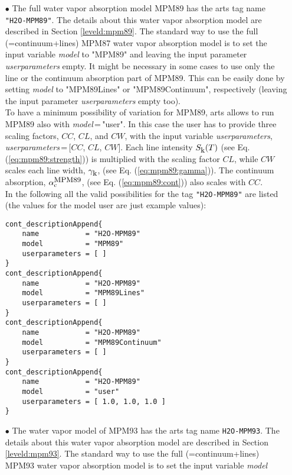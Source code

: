 \begin{itemize}
\item[$\bullet$] The full water vapor absorption model MPM89 \cite{liebe:89} 
     has the arts tag name {\tt "H2O-MPM89"}. The details about 
     this water vapor absorption model are described in 
     Section \ref{leveld:mpm89}.
     The standard way to use the full (=continuum+lines) MPM87 water 
     vapor absorption model is to set the input variable {\it model} 
     to "MPM89" and leaving the input parameter {\it userparameters} empty. 
     It might be necessary in some cases to use only the line or the 
     continuum absorption part of MPM89. This can be easily done 
     by setting {\it model} to "MPM89Lines" or "MPM89Continuum", 
     respectively (leaving the input parameter {\it userparameters} 
     empty too).\\ To have a minimum possibility of variation for MPM89, 
     arts allows to run MPM89 also with {\it model}\,=\,"user". 
     In this case the user has to provide three scaling factors,  
     $CC$, $CL$, and $CW$, with the input variable {\it userparameters}, 
     {\it userparameters}\,=\,$[$$CC$, $CL$, $CW$$]$. 
     Each line intensity $S_{\mbox{\rm \small k}}(T)$ (see Eq. (\ref{eq:mpm89:strength})) 
     is multiplied with the scaling factor $CL$, while $CW$ scales 
     each line width, $\gamma_{\mbox{\rm \small k}}$, (see Eq. (\ref{eq:mpm89:gamma})). 
     The continuum absorption, $\alpha^{\mbox{\rm \small MPM89}}_{\rm c}$, 
     (see Eq. (\ref{eq:mpm89:cont})) also scales with $CC$.\\
     In the following all the valid possibilities for the
     tag {\tt "H2O-MPM89"} are listed (the values for the 
     model user are just example values): 
\begin{verbatim}
cont_descriptionAppend{
    name           = "H2O-MPM89"
    model          = "MPM89"
    userparameters = [ ]
}
cont_descriptionAppend{
    name           = "H2O-MPM89"
    model          = "MPM89Lines"
    userparameters = [ ]
}
cont_descriptionAppend{
    name           = "H2O-MPM89"
    model          = "MPM89Continuum"
    userparameters = [ ]
}
cont_descriptionAppend{
    name           = "H2O-MPM89"
    model          = "user"
    userparameters = [ 1.0, 1.0, 1.0 ]
}
\end{verbatim}
\item[$\bullet$] The water vapor model of MPM93 \cite{liebeetal:93}
     has the arts tag name {\tt H2O-MPM93}. The details about this water vapor 
     absorption model are described in Section \ref{leveld:mpm93}.
     The standard way to use the full (=continuum+lines) MPM93 water 
     vapor absorption model is to set the input variable {\it model} 

\end{itemize}
